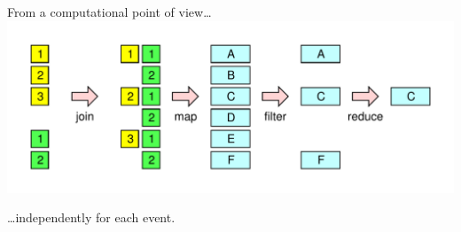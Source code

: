 \documentclass[aspectratio=169]{beamer}
\begin{document}
\begin{frame}{From a computational point of view\ldots}
\Large
\vspace{0.5 cm}
\includegraphics[width=\linewidth]{explode-flat-reduce.pdf}

\hfill \ldots independently for each event.
\end{frame}
\end{document}
